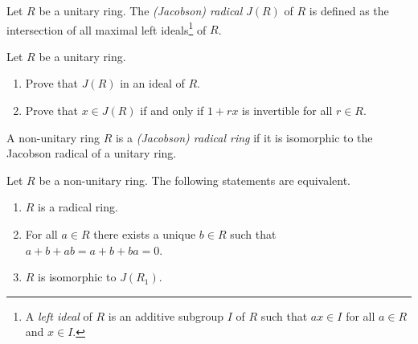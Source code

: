    \begin{definition}
        Let $R$ be a unitary ring.  The \emph{(Jacobson) radical} $J(R)$ of $R$ is defined as the intersection of all maximal left ideals\footnote{A \emph{left ideal} of $R$ is an additive subgroup $I$ of $R$ such that $ax\in I$ for all $a\in R$ and $x\in I$.} of $R$.
   \end{definition}

   \begin{exercise}\label{ex:Jideal}
       Let $R$ be a unitary ring. 
       \begin{enumerate}
           \item Prove that $J(R)$ in an ideal of $R$.
           \item Prove that  $x\in J(R)$ if and only if $1 + rx$ is invertible for all $r\in R$.
       \end{enumerate}
   \end{exercise}

   \begin{definition}
       A non-unitary ring $R$ is a  \emph{(Jacobson) radical ring} if it is isomorphic
        to the Jacobson radical of a unitary ring. 
   \end{definition}

    \begin{proposition}
        Let $R$ be a non-unitary ring. The following statements are equivalent.
    \begin{enumerate}
        \item $R$ is a radical ring.
        \item For all $a\in R$ there exists a unique $b\in R$ such that $a+b+ab=a+b+ba= 0$.
        \item $R$ is isomorphic to $J(R_1)$.
    \end{enumerate}
    \end{proposition}

